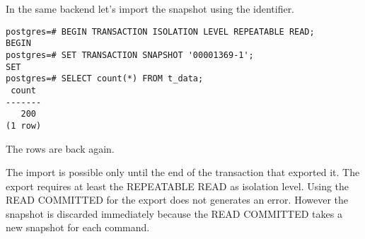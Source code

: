 In the same backend let's import the snapshot using the identifier.

\begin{lstlisting}[style=pgsql]
postgres=# BEGIN TRANSACTION ISOLATION LEVEL REPEATABLE READ;
BEGIN
postgres=# SET TRANSACTION SNAPSHOT '00001369-1';
SET
postgres=# SELECT count(*) FROM t_data;
 count 
-------
   200
(1 row)

\end{lstlisting}

The rows are back again.

The import is possible only until the end of the 
transaction that exported it. The export requires at least the REPEATABLE READ as isolation level.
Using the READ COMMITTED for the export does not generates an error. However the snapshot is
discarded immediately because the READ COMMITTED takes a new snapshot for each command.

